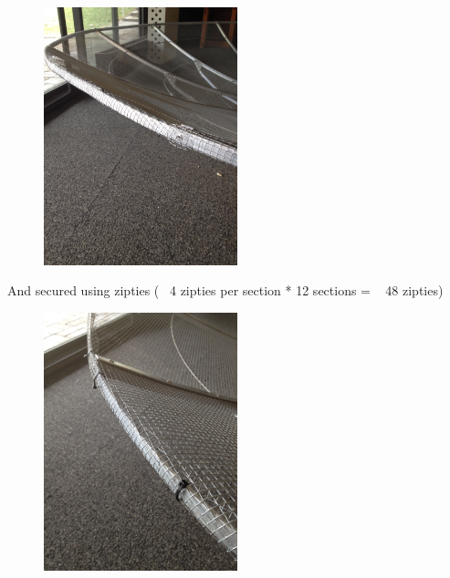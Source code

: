 \documentclass[11pt]{article} %
\begin{document}
\begin{figure}
  \centering
  \caption{   }
  \includegraphics[width=0.50\textwidth]{dish/18.jpeg}
\end{figure}


And secured using zipties (~ 4 zipties per section * 12 sections = ~ 48 zipties)


\begin{figure}
  \centering
  \caption{   }
  \includegraphics[width=0.50\textwidth]{dish/19.jpeg}
\end{figure}
\end{document}
